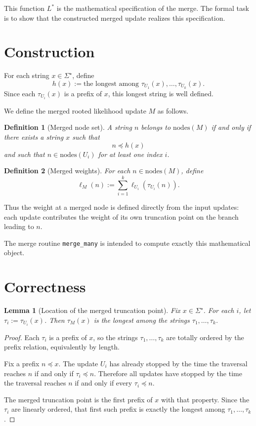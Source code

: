 \documentclass{article}
\newtheorem{definition}{Definition}
\newtheorem{lemma}{Lemma}
\newcommand{\pref}{\preceq}
\begin{document}
This function $L^\ast$ is the mathematical specification of the merge.
The formal task is to show that the constructed merged update realizes this
specification.

\section{Construction}

For each string $x \in \Sigma^\star$, define
\[
h(x) := \text{the longest among } \tau_{U_1}(x),\dots,\tau_{U_k}(x).
\]
Since each $\tau_{U_i}(x)$ is a prefix of $x$, this longest string is well
defined.

We define the merged rooted likelihood update $M$ as follows.

\begin{definition}[Merged node set]
A string $n$ belongs to $\mathrm{nodes}(M)$ if and only if there exists a string
$x$ such that
\[
n \pref h(x)
\]
and such that $n \in \mathrm{nodes}(U_i)$ for at least one index $i$.
\end{definition}

\begin{definition}[Merged weights]
For each $n \in \mathrm{nodes}(M)$, define
\[
\ell_M(n) := \sum_{i=1}^k \ell_{U_i}(\tau_{U_i}(n)).
\]
\end{definition}

Thus the weight at a merged node is defined directly from the input updates:
each update contributes the weight of its own truncation point on the branch
leading to $n$.

The merge routine \texttt{merge\_many} is intended to compute exactly this
mathematical object.

\section{Correctness}

\begin{lemma}[Location of the merged truncation point]
Fix $x \in \Sigma^\star$.
For each $i$, let $\tau_i := \tau_{U_i}(x)$.
Then $\tau_M(x)$ is the longest among the strings
$\tau_1,\dots,\tau_k$.
\end{lemma}

\begin{proof}
Each $\tau_i$ is a prefix of $x$, so the strings $\tau_1,\dots,\tau_k$ are
totally ordered by the prefix relation, equivalently by length.

Fix a prefix $n \pref x$.
The update $U_i$ has already stopped by the time the traversal reaches $n$ if
and only if $\tau_i \pref n$.
Therefore all updates have stopped by the time the traversal reaches $n$ if and
only if every $\tau_i \pref n$.

The merged truncation point is the first prefix of $x$ with that property.
Since the $\tau_i$ are linearly ordered, that first such prefix is exactly the
longest among $\tau_1,\dots,\tau_k$.
\end{proof}
\end{document}
